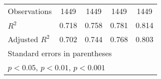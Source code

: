 {\begin{tabular}{l*{4}{c}}
\midrule
Observations        &        1449         &        1449         &        1449         &        1449         \\
\(R^{2}\)           &       0.718         &       0.758         &       0.781         &       0.814         \\
Adjusted \(R^{2}\)  &       0.702         &       0.744         &       0.768         &       0.803         \\
\bottomrule
\multicolumn{5}{l}{\footnotesize Standard errors in parentheses}\\
\multicolumn{5}{l}{\footnotesize \sym{*} \(p<0.05\), \sym{**} \(p<0.01\), \sym{***} \(p<0.001\)}\\
\end{tabular}
}
